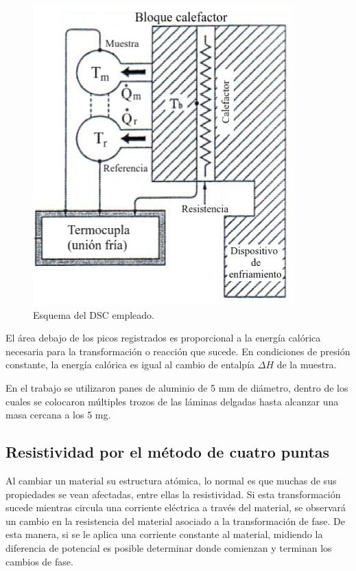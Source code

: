 \documentclass[12pt]{article}
\theoremstyle{definition}
\theoremstyle{remark}
\begin{document}
{\begin{figure}[h]
	\centering
	\includegraphics[scale=0.5]{img/DSCscheme.png}
	\caption{Esquema del DSC empleado.}
	\label{DSCscheme}
\end{figure}

El área debajo de los picos registrados es proporcional a la energía calórica necesaria para la transformación o reacción que sucede. En condiciones de presión constante, la energía calórica es igual al cambio de entalpía $\Delta H$ de la muestra.

En el trabajo se utilizaron panes de aluminio de 5 mm de diámetro, dentro de los cuales se colocaron múltiples trozos de las láminas delgadas hasta alcanzar una masa cercana a los 5 mg.


\subsection{Resistividad por el método de cuatro puntas}

Al cambiar un material su estructura atómica, lo normal es que muchas de sus propiedades se vean afectadas, entre ellas la resistividad. Si esta transformación sucede mientras circula una corriente eléctrica a través del material, se observará un cambio en la resistencia del material asociado a la transformación de fase. De esta manera, si se le aplica una corriente constante al material, midiendo la diferencia de potencial es posible determinar donde comienzan y terminan los cambios de fase.


}
\end{document}
